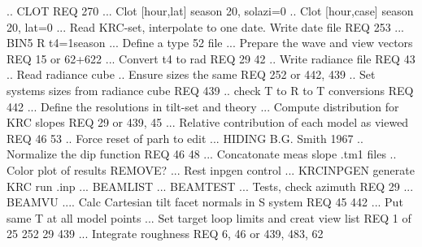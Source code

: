 \documentclass{article}
\begin{document}
\qi {}.. CLOT REQ 270
\qi {}... Clot [hour,lat] season 20, solazi=0
\qi {}.. Clot [hour,case] season 20, lat=0
\qi {}... Read KRC-set, interpolate to one date. Write date file REQ 253
\qi {}... BIN5 R t4=1season
\qi {}... Define a type 52 file
\qi {}... Prepare the wave and view vectors REQ 15 or 62+622
\qi {}... Convert t4 to rad  REQ 29 42
\qi {}.. Write radiance file REQ 43
\qi {}.. Read radiance cube
\qi {}.. Ensure sizes the same REQ 252 or 442, 439
\qi {}.. Set systems sizes from radiance cube REQ 439
\qi {}.. check T to R to T conversions REQ 442
\qi {}... Define the resolutions in tilt-set and theory 
\qi {}... Compute distribution for KRC slopes REQ 29 or 439, 45
\qi {}... Relative contribution of each model as viewed REQ 46 53
\qi {}.. Force reset of parh to edit 
\qi {}... HIDING  B.G. Smith 1967
\qi {}.. Normalize the dip function REQ 46 48
\qi {}... Concatonate meas slope .tm1 files
\qi {}.. Color plot of results  REMOVE?
\qi {}... Rest inpgen control
\qi {}... KRCINPGEN generate KRC run .inp
\qi {}... BEAMLIST
\qi {}... BEAMTEST
\qi {}... Tests, check azimuth  REQ 29
\qi {}... BEAMVU
\qi {}.... Calc Cartesian tilt facet normals in S system  REQ 45  442
\qi {}... Put same T at all model points
\qi {}... Set target loop limits and creat view list REQ 1 of 25 252 29 439
\qi {}... Integrate roughness REQ  6, 46 or 439, 483, 62
\end{document}
